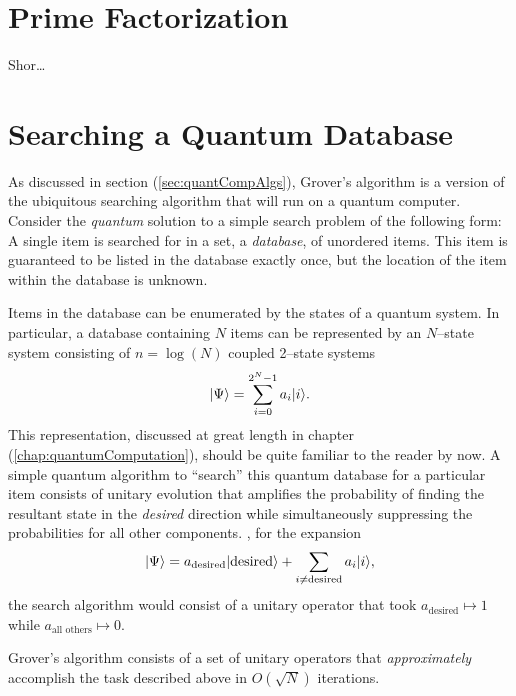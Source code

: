 \section{Prime Factorization}

Shor\dots

\section{Searching a Quantum Database}
\label{sec:grover}

As discussed in section (\ref{sec:quantCompAlgs}), Grover's algorithm is
a version of the ubiquitous searching algorithm that will run on a quantum
computer.  Consider the {\sl quantum} solution to a simple search problem of 
the following form: A
single item is searched for in a set, a \emph{database}, of unordered items.  
This item is guaranteed to be listed in the database exactly once, but 
the location of the item within the database is unknown.

Items in the database can be enumerated by the states of a quantum system.
In particular, a database containing $N$ items can be represented by an
$N$--state system consisting of $n=\log(N)$ coupled 2--state systems
\begin{equation}
{|{\Psi}\rangle} = \sum_{i=0}^{2^N-1} a_i{|{i}\rangle}.
\end{equation}
This representation, discussed at great
length in chapter (\ref{chap:quantumComputation}),
should be quite familiar to the reader by now.
A simple quantum algorithm to ``search'' this quantum database
for a particular item consists of unitary evolution that amplifies 
the probability of finding the resultant state in the \emph{desired}
direction while simultaneously suppressing the probabilities for all
other components. \ie, for the expansion
\begin{equation}
{|{\Psi}\rangle} = a_{\text{desired}}{|{\text{desired}}\rangle} +
\sum_{i\ne\text{desired}} a_i{|{i}\rangle},
\end{equation}
the search algorithm would consist of a unitary operator that took
$a_{\text{desired}}\mapsto 1$ while $a_{\text{all others}}\mapsto 0$.

Grover's algorithm consists of a set of unitary operators that
{\sl approximately} accomplish the task described above in 
$O(\sqrt{N})$ iterations.   


